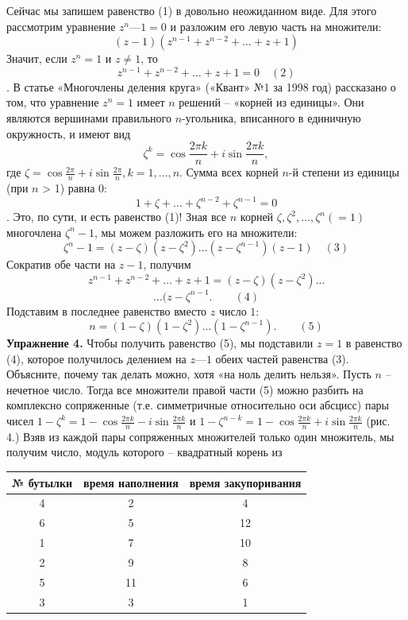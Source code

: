 \documentclass[9pt]{article}
\begin{document}
\begin{multicols}{2}
Сейчас мы запишем равенство (1) в довольно неожиданном виде. Для этого рассмотрим уравнение $z^n — 1 = 0$ и
разложим его левую часть на множители:
$$(z-1)(z^{n-1}+z^{n-2}+\ldots+z+1)$$
Значит, если $z^n=1$ и $z\neq1$, то \newline
$$z^{n-1}+z^{n-2}+\ldots+z+1=0 \quad(2)$$.
В статье «Многочлены деления круга» («Квант» №1 за
1998 год) рассказано о том, что уравнение $z^n=1$ имеет $n$
решений – «корней из единицы». Они являются вершинами правильного $n$-угольника, вписанного в единичную окружность, и имеют вид
$$\zeta^k=\cos{\frac{2\pi k}{n}}+i\sin{\frac{2\pi k}{n}},$$
где 
$\zeta=\cos{\frac{2\pi}{n}}+i\sin{\frac{2\pi}{n},k=1,\ldots,n}$.
Сумма всех корней $n$-й степени из единицы (при $n$ > 1) равна $0$:
$$1+\zeta+\ldots+\zeta^{n-2}+\zeta^{n-1}=0$$.
Это, по сути, и есть равенство (1)!
Зная все $n$ корней 
$\zeta,\zeta^2,\ldots,\zeta^n(=1)$ 
многочлена $\zeta^n-1$, 
мы можем разложить его на множители:
$$\zeta^n-1=(z-\zeta)(z-\zeta^2)\ldots(z-\zeta^{n-1})(z-1) \quad(3)$$
Сократив обе части на $z-1$, получим
$$z^{n-1}+z^{n-2}+\ldots+z+1=(z-\zeta)(z-\zeta^2)\ldots$$
$$\ldots(z-\zeta^{n-1}. \qquad (4)$$
Подставим в последнее равенство вместо $z$ число $1$:
$$n=(1-\zeta)(1-\zeta^2)\ldots(1-\zeta^{n-1}). \qquad (5)$$ 
\newline
\textbf{Упражнение 4.} Чтобы получить равенство (5), мы подставили $z = 1$ в равенство (4), которое получилось делением на $z — 1$ обеих частей равенства (3). Объясните, почему так делать можно, хотя «на ноль делить нельзя». 
\newline
Пусть $n$ – нечетное число. Тогда все множители правой
части (5) можно разбить на комплексно сопряженные
(т.е. симметричные относительно оси абсцисс) пары
чисел $1-\zeta^k=1-\cos{\frac{2\pi k}{n}-i\sin{\frac{2\pi k}{n}}}$ и $1-\zeta^{n-k}=1-\cos{\frac{2\pi k}{n} + i\sin{\frac{2\pi k}{n}}}$ (рис. 4.)
Взяв из каждой пары сопряженных множителей только один множитель, мы
получим число, модуль которого – квадратный корень из

\end{multicols}
\newpage

\begin{center}
\begin{tabular}{ |c|c|c| }
\hline
 № бутылки & время наполнения & время закупоривания \\ 
 \hline
 4 & 2 & 4 \\  
 6 & 5 & 12 \\
 1 & 7 & 10 \\
 2 & 9 & 8 \\
 5 & 11 & 6 \\
 3 & 3 & 1 \\
 \hline
\end{tabular}
\end{center}
\end{document}
